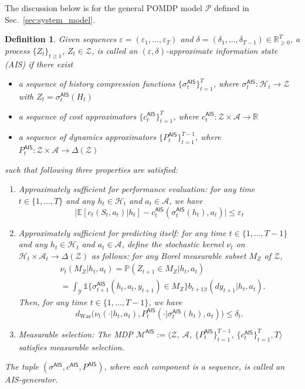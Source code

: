 \documentclass[letterpaper, 10pt]{IEEEtran}
\theoremstyle{plain}
\newtheorem{definition}{Definition}
\theoremstyle{nonumberplain}
\theoremstyle{plain}
\newcommand*\ALPHABET{\mathcal}
\newcommand*\PR{\mathds{P}}
\newcommand*\EXP{\mathds{E}}
\newcommand*\IND{\mathds{1}}
\newcommand*\reals{\mathds{R}}
\newcommand\dWas{d_{\mathrm{Was}}}
\newcommand*\AIS{\mathsf{AIS}}
\begin{document}
The discussion below is for the general POMDP model $\ALPHABET P$ defined in Sec.~\ref{sec:system_model}.
\begin{definition}
   Given sequences $\varepsilon = (\varepsilon_1, \dots, \varepsilon_T)$ and $\delta = (\delta_1, \dots, \delta_{T-1}) \in \reals^T_{\ge 0}$, 
   a process $\{Z_t\}_{t \ge 1}$, $Z_t \in \ALPHABET Z$, is called an $(\varepsilon, \delta)$-\emph{approximate information state (AIS)} if there exist
   \begin{itemize}
       \item a sequence of history compression functions $\{\sigma^{\AIS}_t\}_{t=1}^T$, where $\sigma^{\AIS}_t \colon \ALPHABET H_t \to \ALPHABET Z$ with $Z_t = \sigma^{\AIS}_t(H_t)$
       \item a sequence of cost approximators $\{c^{\AIS}_t\}_{t=1}^T$, where $c^{\AIS}_t \colon \ALPHABET Z \times \ALPHABET A \to \reals$
       \item a sequence of dynamics approximators $\{P^{\AIS}_t\}_{t =1}^{T-1}$, where $P^{\AIS}_t \colon \ALPHABET Z \times \ALPHABET A \to \Delta(\ALPHABET Z)$
   \end{itemize}
   such that following three properties are satisfied:
   \begin{enumerate}[leftmargin=3em]
       \item[(AP1)] \emph{Approximately sufficient for performance evaluation:}
       for any time $t \in \{1, \dots, T\}$ and any $h_t \in \ALPHABET H_t$ and $a_t \in \ALPHABET A$, we have
       \[
       \bigl| \EXP[ c_t(S_t, a_t) | h_t ] - c^{\AIS}_t(\sigma^{\AIS}_t(h_t), a_t) \bigr| \le \varepsilon_t
       \]
       \item[(AP2)] \emph{Approximately sufficient for predicting itself:} 
       for any time $t \in \{1, \dots, T-1\}$ and any $h_t \in \ALPHABET H_t$ and $a_t \in \ALPHABET A$, define the stochastic kernel $\nu_t$ on $\ALPHABET H_t \times \ALPHABET A_t \to \Delta(\ALPHABET Z)$ as follows: for any Borel measurable subset $M_Z$ of $\ALPHABET Z$, 
       \begin{align*}
           &\nu_t(M_Z | h_t, a_t) = \PR(Z_{t+1} \in M_Z | h_t, a_t) \\
           & = \int_{\ALPHABET Y} \IND\{ \sigma^{\AIS}_{t+1}(h_t,a_t,y_{t+1}) \in M_Z \} b_{t+1|t}(dy_{t+1} | h_t, a_t).
       \end{align*}
       Then, for any time $t \in \{1, \dots, T-1\}$, we have
       \[
       \dWas\bigl( \nu_t(\cdot | h_t, a_t), P^{\AIS}_t( \cdot | \sigma^{\AIS}_t(h_t), a_t) \bigr) \le \delta_t.
       \]
       \item[(M)]\emph{Measurable selection:} The MDP $\ALPHABET M^{\AIS} :=\langle \ALPHABET Z$, $\ALPHABET A$, $\{P^{\AIS}_t\}_{t=1}^{T-1}$, $\{c^\AIS_t\}_{t=1}^T, T \rangle$ satisfies measurable selection.
   \end{enumerate}
   The tuple $(\sigma^{\AIS}, c^{\AIS}, P^{\AIS})$, where each component is a sequence, is called an \emph{AIS-generator}. 
\end{definition}
\end{document}
